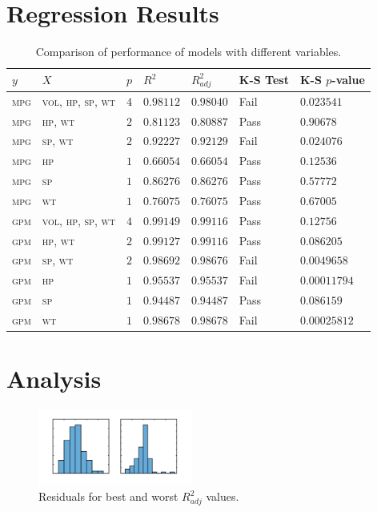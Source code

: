 \documentclass[a4paper,10pt,twocolumn]{article}
\begin{document}
\section{Regression Results}

\begin{table}[]
    \centering
    \begin{tabular}{lllllll}
        \toprule
        $y$ & $X$ & $p$ & $R^2$ & $R^2_{adj}$ & K-S Test & K-S $p$-value \\
        \midrule
        \textsc{mpg} & \textsc{vol, hp, sp, wt} & $4$ &
        $0.98112$ & $0.98040$ & Fail & $0.023541$ \\
        \textsc{mpg} & \textsc{hp, wt} & $2$ &
        $0.81123$ & $0.80887$ & Pass & $0.90678$ \\
        \textsc{mpg} & \textsc{sp, wt} & $2$ &
        $0.92227$ & $0.92129$ & Fail & $0.024076$ \\
        \textsc{mpg} & \textsc{hp} & $1$ &
        $0.66054$ & $0.66054$ & Pass & $0.12536$ \\
        \textsc{mpg} & \textsc{sp} & $1$ &
        $0.86276$ & $0.86276$ & Pass & $0.57772$ \\
        \textsc{mpg} & \textsc{wt} & $1$ &
        $0.76075$ & $0.76075$ & Pass & $0.67005$ \\
        \textsc{gpm} & \textsc{vol, hp, sp, wt} & $4$ &
        $0.99149$ & $0.99116$ & Pass & $0.12756$ \\
        \textsc{gpm} & \textsc{hp, wt} & $2$ &
        $0.99127$ & $0.99116$ & Pass & $0.086205$ \\
        \textsc{gpm} & \textsc{sp, wt} & $2$ &
        $0.98692$ & $0.98676$ & Fail & $0.0049658$ \\
        \textsc{gpm} & \textsc{hp} & $1$ &
        $0.95537$ & $0.95537$ & Fail & $0.00011794$ \\
        \textsc{gpm} & \textsc{sp} & $1$ &
        $0.94487$ & $0.94487$ & Pass & $0.086159$ \\
        \textsc{gpm} & \textsc{wt} & $1$ &
        $0.98678$ & $0.98678$ & Fail & $0.00025812$ \\
        \bottomrule
    \end{tabular}
    \caption{Comparison of performance of models with different variables.}
    \label{table:reg}
\end{table}
    
\section{Analysis}

\begin{figure}[h]
    \centering
    \includegraphics[width=0.45\textwidth]{Residuals}
    \caption{Residuals for best and worst $R^2_{adj}$ values.}
    \label{fig:Residuals}
\end{figure}

\printbibliography

\clearpage
\end{document}
